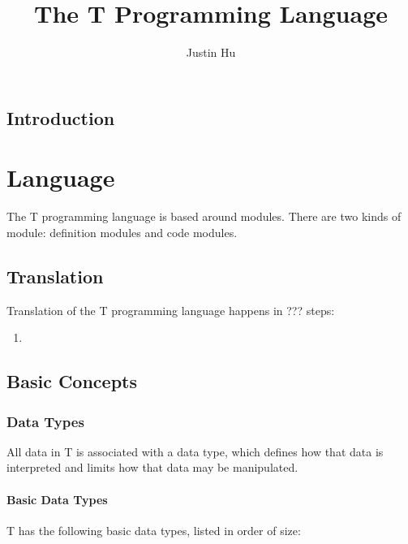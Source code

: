 \documentclass[letterpaper,12pt]{book}
\begin{document}
\title{The T Programming Language}
\author{Justin Hu}
\maketitle
\tableofcontents

\chapter{Introduction}

\part{Language}

The T programming language is based around modules. There are two kinds of module: definition modules and code modules.

\chapter{Translation}

Translation of the T programming language happens in ??? steps:

\begin{enumerate}
	\item 
\end{enumerate}

\chapter{Basic Concepts}

\section{Data Types}

All data in T is associated with a data type, which defines how that data is interpreted and limits how that data may be manipulated.

\subsection{Basic Data Types}

T has the following basic data types, listed in order of size:
\end{document}
